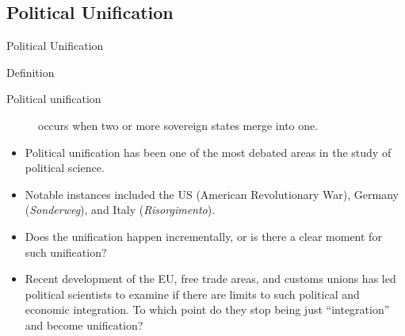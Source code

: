 \documentclass{beamer}
\begin{document}
	\subsection{Political Unification}
	\begin{frame}{Political Unification}
		\begin{block}{Definition}
			\begin{description}
				\item[Political unification] occurs when two or more sovereign states merge into one.
			\end{description}
		\end{block}
		\begin{itemize}
			\item Political unification has been one of the most debated areas in the study of political science.
			\item Notable instances included the US (American Revolutionary War), Germany (\textit{Sonderweg}), and Italy (\textit{Risorgimento}).
			\item Does the unification happen incrementally, or is there a clear moment for such unification?
			\item Recent development of the EU, free trade areas, and customs unions has led political scientists to examine if there are limits to such political and economic integration. To which point do they stop being just ``integration'' and become unification?
		\end{itemize}
	\end{frame}
\end{document}
